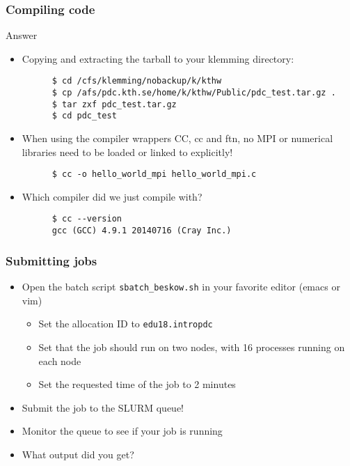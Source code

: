 \begin{frame}[fragile]
  \frametitle{Compiling code}
\begin{exampleblock}{{Answer}}
    \verbatimfont{\footnotesize}
    \begin{itemize}
    \item Copying and extracting the tarball to your klemming directory:
    \begin{verbatim}
      $ cd /cfs/klemming/nobackup/k/kthw
      $ cp /afs/pdc.kth.se/home/k/kthw/Public/pdc_test.tar.gz .
      $ tar zxf pdc_test.tar.gz
      $ cd pdc_test
    \end{verbatim}

    \item When using the compiler wrappers CC, cc and ftn, no MPI or numerical libraries need to be loaded 
      or linked to explicitly!
    \begin{verbatim}
      $ cc -o hello_world_mpi hello_world_mpi.c
    \end{verbatim}
    \item Which compiler did we just compile with?
    \begin{verbatim}
      $ cc --version
      gcc (GCC) 4.9.1 20140716 (Cray Inc.)
    \end{verbatim}

    \end{itemize}

\end{exampleblock}
\end{frame}


\begin{frame}[fragile]
  \frametitle{Submitting jobs}
\begin{itemize}
  \item Open the batch script \verb|sbatch_beskow.sh| in your favorite editor (emacs or vim)
    \begin{itemize}
      \item Set the allocation ID to \verb|edu18.intropdc|
      \item Set that the job should run on two nodes, with 16 processes running on each node
      \item Set the requested time of the job to 2 minutes
    \end{itemize}
  \item Submit the job to the SLURM queue!
  \item Monitor the queue to see if your job is running
  \item What output did you get?
\end{itemize}
\end{frame}


